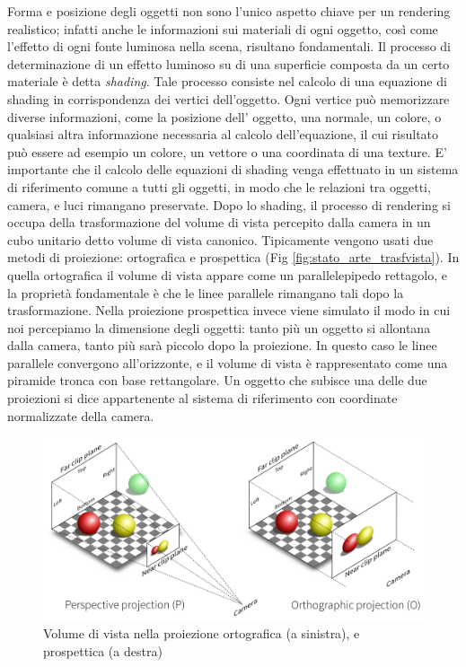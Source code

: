 Forma e posizione degli oggetti non sono l’unico aspetto chiave per un rendering realistico; infatti anche le informazioni sui materiali di ogni oggetto, così come l’effetto di ogni fonte luminosa nella scena, risultano fondamentali. 
Il processo di determinazione di un effetto luminoso su di una superficie composta da un certo materiale è detta \emph{shading}. 
Tale processo consiste nel calcolo di una equazione di shading in corrispondenza dei vertici dell’oggetto. Ogni vertice può memorizzare diverse informazioni, come la posizione dell’ oggetto, una normale, un colore, o qualsiasi altra informazione necessaria al calcolo dell’equazione, il cui risultato può essere ad esempio un colore, un vettore o una coordinata di una texture. 
E’ importante che il calcolo delle equazioni di shading venga effettuato in un sistema di riferimento comune a tutti gli oggetti, in modo che le relazioni tra oggetti, camera, e luci rimangano preservate. 
Dopo lo shading, il processo di rendering si occupa della trasformazione del volume di vista percepito dalla camera in un cubo unitario detto volume di vista canonico.
Tipicamente vengono usati due metodi di proiezione: ortografica e prospettica (Fig \ref{fig:stato_arte_trasfvista}).
In quella ortografica il volume di vista appare come un parallelepipedo rettagolo, e la proprietà fondamentale è che le linee parallele rimangano tali dopo la trasformazione.
Nella proiezione prospettica invece viene simulato il modo in cui noi percepiamo la dimensione degli oggetti: tanto più un oggetto si allontana dalla camera, tanto più sarà piccolo dopo la proiezione. In questo caso le linee parallele convergono all’orizzonte, e il volume di vista è rappresentato come una piramide tronca con base rettangolare.
Un oggetto che subisce una delle due proiezioni  si dice appartenente al sistema di riferimento con coordinate normalizzate della camera. 
\\
\begin{figure}[htb]
 \centering
 \includegraphics[width=1.0\linewidth]{images/chapter_stato_arte/stato_arte_projections.png}\hfill
 \caption[Proiezione prospettica ed ortogonale]{Volume di vista nella proiezione ortografica (a sinistra), e prospettica (a destra)}
 \label{fig:stato_arte_projections}
\end{figure}


